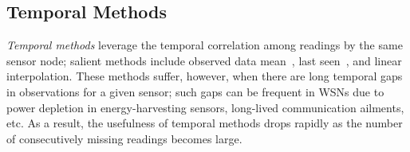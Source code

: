 \subsection{Temporal Methods}
{\em Temporal methods} leverage the temporal correlation among
readings by the same sensor node; salient methods include observed
data mean~\cite{madden2005tinydb}, last
seen~\cite{Granger:lastseen}, and linear interpolation. %
%
These methods
suffer, however, when there are long temporal gaps in observations for a given
sensor; such gaps can be frequent in WSNs due to power depletion in
energy-harvesting sensors, long-lived communication ailments, etc.  
As a result, the usefulness of temporal methods drops rapidly as the number of consecutively missing readings
becomes large.




